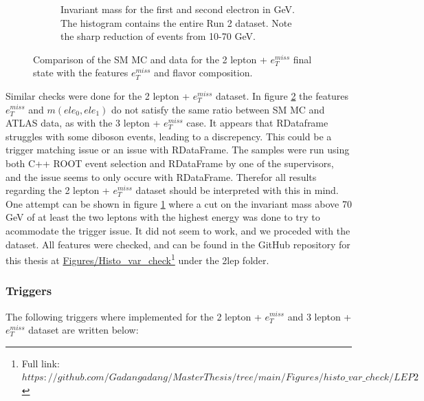 \begin{figure}[H]
\begin{subfigure}{.6\textwidth}
        \caption{Invariant mass for the first and second electron in GeV. The histogram contains the entire Run 2 dataset. Note the sharp reduction of events from 10-70 GeV.}
        \label{fig:mll_2lep}
    \end{subfigure}
    \hfill        
    \caption[2 lepton + $e_T^{miss}$ Monte Carlo and ATLAS data comparison]{Comparison of the SM MC and data for the 2 lepton + $e_T^{miss}$ final state with the features $e_{T}^{miss}$ and flavor composition.
    }
    \label{fig:MC_Data_comp_2lep}
\end{figure}

Similar checks were done for the 2 lepton + $e_T^{miss}$ dataset. In figure \ref{fig:MC_Data_comp_2lep} the features $e_T^{miss}$ and $m(ele_0, ele_1)$ 
do not satisfy the same ratio between SM MC and ATLAS data, as with the 3 lepton + $e_T^{miss}$ case. It appears that RDataframe struggles with some diboson events, 
leading to a discrepency. This could be a trigger matching issue or an issue with RDataFrame. The samples were run using both C++ ROOT event selection and RDataFrame by one of the supervisors, and the 
issue seems to only occure with RDataFrame. Therefor all results regarding the 2 lepton + $e_T^{miss}$ dataset should be interpreted with this in mind. One attempt can be shown in 
figure \ref{fig:mll_2lep} where a cut on the invariant mass above 70 GeV of at least the two leptons with the highest energy was done to try to acommodate the trigger issue. 
It did not seem to work, and we proceded with the dataset. All features were checked, and can be found in the GitHub repository for this thesis at 
\href{https://github.com/Gadangadang/MasterThesis/tree/main}{Figures/Histo\_var\_check}\footnote{Full link: \href{https://github.com/Gadangadang/MasterThesis/tree/main/Figures/histo_var_check/LEP2}{$https://github.com/Gadangadang/MasterThesis/tree/main/Figures/histo\_var\_check/LEP2$}} under the 2lep folder.



\subsubsection*{Triggers }\label{sec:triggers}
The following triggers where implemented for the 2 lepton + $e_T^{miss}$  and 3 lepton + $e_T^{miss}$ dataset are written below:


